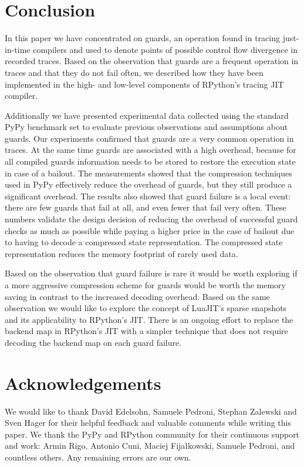 \documentclass[10pt,preprint]{sigplanconf}
\begin{document}


\section{Conclusion}
\label{sec:Conclusion}
In this paper we have concentrated on guards, an operation found in
tracing just-in-time compilers and used to denote points of possible control
flow divergence in recorded traces.
Based on the observation that guards are a frequent operation in traces and
that they do not fail often, we described how they have been implemented in the
high- and low-level components of RPython's tracing JIT compiler.

Additionally we have presented experimental data collected using the standard PyPy
benchmark set to evaluate previous observations and assumptions about guards. Our
experiments confirmed that guards are a very common
operation in traces. At the same time guards are associated with a high
overhead, because for all compiled guards information needs to be
stored to restore the execution state in case of a bailout. The measurements
showed that the compression techniques used in PyPy effectively reduce the
overhead of guards, but they still produce a significant overhead. The results
also showed that guard failure is a local event: there are few
guards that fail at all, and even fewer that fail very often.
These numbers validate the design decision of reducing the overhead of
successful guard checks as much as possible while paying a higher price in the
case of bailout due to having to decode a compressed state representation.
The compressed state representation reduces the memory footprint of rarely
used data.

Based on the observation that guard failure is rare it
would be worth exploring if a more aggressive compression scheme for guards
would be worth the memory saving in contrast to the increased decoding
overhead. Based on the same observation we would like to explore the concept of
LuaJIT's sparse snapshots and its applicability to RPython's JIT.
There is an ongoing effort to replace the backend map in RPython's JIT with a
simpler technique that does not require decoding the backend map on each guard
failure.

\section*{Acknowledgements}
We would like to thank David Edelsohn, Samuele Pedroni, Stephan Zalewski and Sven Hager for their helpful
feedback and valuable comments while writing this paper.
We thank the PyPy and RPython community for their continuous support and work:
Armin Rigo, Antonio Cuni, Maciej Fijałkowski, Samuele Pedroni, and countless
others. Any remaining errors are our own.
\end{document}
